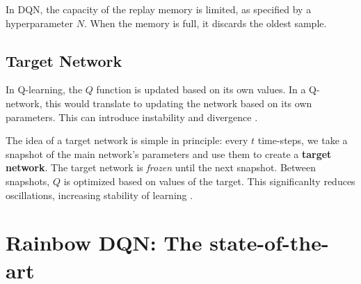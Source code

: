In DQN, the capacity of the replay memory is limited, as specified by a hyperparameter \(N\). When the memory is full, it discards the oldest sample.

\subsection{Target Network}

In Q-learning, the \(Q\) function is updated based on its own values.
In a Q-network, this would translate to updating the network based on its own parameters. This can introduce instability and divergence \cite{jaromiru-dqn}.

The idea of a target network is simple in principle:
every \(t\) time-steps, we take a snapshot of the main network's parameters and use them to create a \textbf{target network}.
The target network is \emph{frozen} \cite{long-peak-rl} until the next snapshot.
Between snapshots, \(Q\) is optimized based on values of the target.
This significanlty reduces oscillations, increasing stability of learning \cite{atari-dqn}.

\section{Rainbow DQN: The state-of-the-art}
